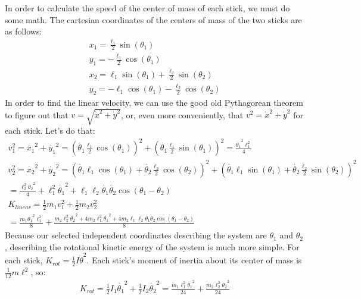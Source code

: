\documentclass[]{article}
\begin{document}
In order to calculate the speed of the center of mass of each stick, we must do some math. The cartesian coordinates of the centers of mass of the two sticks are as follows:
\begin{gather*}
x_1 = \frac{\ell_1}{2}\sin(\theta_1) \\
y_1 = -\frac{\ell_1}{2}\cos(\theta_1) \\
x_2 = \ell_1\sin(\theta_1) + \frac{\ell_2}{2}\sin(\theta_2) \\
y_2 = -\ell_1\cos(\theta_1) - \frac{\ell_2}{2}\cos(\theta_2)
\end{gather*}
In order to find the linear velocity, we can use the good old Pythagorean theorem to figure out that $v = \sqrt{\dot{x}^2 + \dot{y}^2}$, or, even more conveniently, that $v^2 = \dot{x}^2 + \dot{y}^2$ for each stick. Let's do that:
\begin{gather*}
	v_1^2 = \dot{x_1}^2 + \dot{y_1}^2 = (\dot{\theta_1} \frac{\ell_1}{2}\cos(\theta_1))^2 + (\dot{\theta_1} \frac{\ell_1}{2}\sin(\theta_1))^2 = \frac{\dot{\theta_1}^2\ell_1^2}{4}\\
	v_2^2 = \dot{x_2}^2 + \dot{y_2}^2 = (\dot{\theta_1}\ell_1\cos(\theta_1) + \dot{\theta_2}\frac{\ell_2}{2}\cos(\theta_2))^2 + (\dot{\theta_1}\ell_1\sin(\theta_1) + \dot{\theta_2}\frac{\ell_2}{2}\sin(\theta_2))^2 \\
	= \frac{\ell_2^2\dot{\theta_2}^2}{4} + \ell_1^2\dot{\theta_1}^2 + \ell_1\ell_2\dot{\theta_1}\dot{\theta_2}\cos(\theta_1 - \theta_2)\\
	K_{linear} = \frac{1}{2}m_1v_1^2 + \frac{1}{2}m_2v_2^2 \\
	= \frac{m_1\dot{\theta_1}^2\ell_1^2}{8} + \frac{m_2\ell_2^2\dot{\theta_2}^2 +4m_2\ell_1^2\dot{\theta_1}^2 + 4m_2\ell_1\ell_2\dot{\theta_1}\dot{\theta_2}\cos(\theta_1 - \theta_2)}{8}
\end{gather*}
Because our selected independent coordinates describing the system are $\theta_1$ and $\theta_2$, describing the rotational kinetic energy of the system is much more simple. For each stick, $K_{rot} = \frac12 I \dot{\theta}^2$. Each stick's moment of inertia about its center of mass is $\frac{1}{12} m \ell^2$, so:
\begin{gather*}
	K_{rot} = \frac12I_1\dot{\theta_1}^2 + \frac12I_2\dot{\theta_2}^2 = \frac{m_1\ell_1^2\dot{\theta_1}^2}{24} + \frac{m_2\ell_2^2\dot{\theta_2}^2}{24}
\end{gather*}
\end{document}
